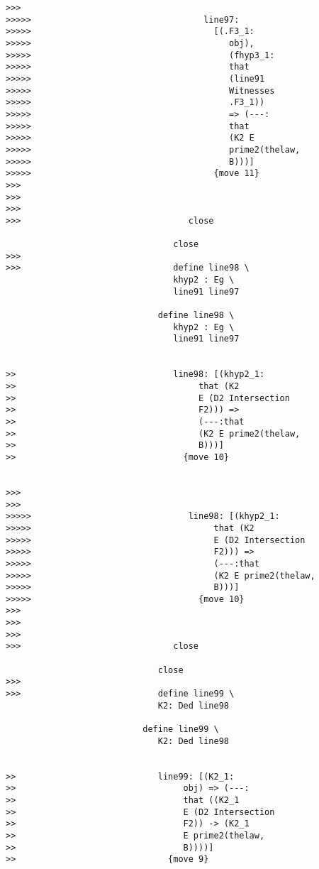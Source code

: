 \documentclass[12pt]{article}
\begin{document}
\begin{verbatim}
>>>
>>>>>                                  line97:
>>>>>                                    [(.F3_1:
>>>>>                                       obj),
>>>>>                                       (fhyp3_1:
>>>>>                                       that
>>>>>                                       (line91
>>>>>                                       Witnesses
>>>>>                                       .F3_1))
>>>>>                                       => (---:
>>>>>                                       that
>>>>>                                       (K2 E
>>>>>                                       prime2(thelaw,
>>>>>                                       B)))]
>>>>>                                    {move 11}
>>>
>>>
>>>
>>>                                 close

                                 close
>>>
>>>                              define line98 \
                                 khyp2 : Eg \
                                 line91 line97

                              define line98 \
                                 khyp2 : Eg \
                                 line91 line97


>>                               line98: [(khyp2_1:
>>                                    that (K2
>>                                    E (D2 Intersection
>>                                    F2))) =>
>>                                    (---:that
>>                                    (K2 E prime2(thelaw,
>>                                    B)))]
>>                                 {move 10}


>>>
>>>
>>>>>                               line98: [(khyp2_1:
>>>>>                                    that (K2
>>>>>                                    E (D2 Intersection
>>>>>                                    F2))) =>
>>>>>                                    (---:that
>>>>>                                    (K2 E prime2(thelaw,
>>>>>                                    B)))]
>>>>>                                 {move 10}
>>>
>>>
>>>
>>>                              close

                              close
>>>
>>>                           define line99 \
                              K2: Ded line98

                           define line99 \
                              K2: Ded line98


>>                            line99: [(K2_1:
>>                                 obj) => (---:
>>                                 that ((K2_1
>>                                 E (D2 Intersection
>>                                 F2)) -> (K2_1
>>                                 E prime2(thelaw,
>>                                 B))))]
>>                              {move 9}



\end{verbatim}
\end{document}
